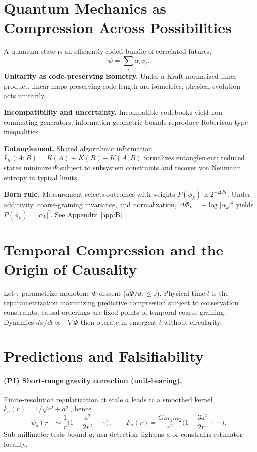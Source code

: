 \documentclass[aps,preprint,onecolumn,longbibliography,nofootinbib]{revtex4-2}
\numberwithin{equation}{section}        %
\begin{document}
\section{Quantum Mechanics as Compression Across Possibilities}
A quantum state is an efficiently coded bundle of correlated futures,
\begin{equation}
\psi=\sum_i \alpha_i \phi_i. \label{eq:super}
\end{equation}
\textbf{Unitarity as code-preserving isometry.} Under a Kraft-normalized inner product, linear maps preserving code length are isometries; physical evolution acts unitarily.

\textbf{Incompatibility and uncertainty.} Incompatible codebooks yield non-commuting generators; information-geometric bounds reproduce Robertson-type inequalities.

\textbf{Entanglement.} Shared algorithmic information $I_K(A\!:\!B)=K(A)+K(B)-K(A,B)$ formalizes entanglement; reduced states minimize $\Phi$ subject to subsystem constraints and recover von Neumann entropy in typical limits.

\textbf{Born rule.} Measurement selects outcomes with weights $P(\phi_k)\propto 2^{-\Delta\Phi_k}$. Under additivity, coarse-graining invariance, and normalization, $\Delta\Phi_k=-\log|\alpha_k|^2$ yields $P(\phi_k)=|\alpha_k|^2$. See Appendix~\ref{app:B}.

\section{Temporal Compression and the Origin of Causality}
Let $\tau$ parametrize monotone $\Phi$-descent ($d\Phi/d\tau\le 0$). Physical time $t$ is the reparametrization maximizing predictive compression subject to conservation constraints; causal orderings are fixed points of temporal coarse-graining. Dynamics $dx/dt\propto-\nabla\widehat\Phi$ then operate in emergent $t$ without circularity.

\section{Predictions and Falsifiability}
\paragraph*{(P1) Short-range gravity correction (unit-bearing).}
Finite-resolution regularization at scale $a$ leads to a smoothed kernel $k_a(r)=1/\sqrt{r^2+a^2}$, hence
\begin{equation}
\psi_a(r)\sim \frac{1}{r}\Big(1-\frac{a^2}{2r^2}+\cdots\Big),\qquad
F_a(r)=\frac{Gm_1m_2}{r^2}\Big(1-\frac{3a^2}{2r^2}+\cdots\Big). \label{eq:short}
\end{equation}
Sub-millimeter tests bound $a$; non-detection tightens $a$ or constrains estimator locality.
\end{document}
